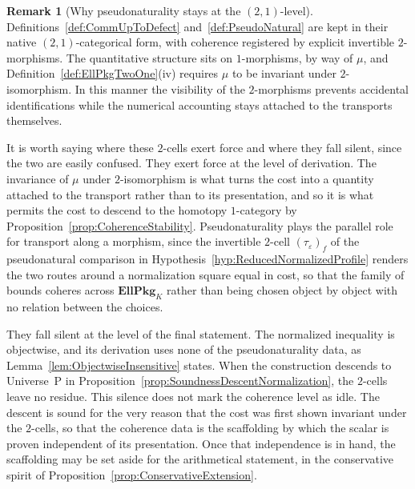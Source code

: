 \documentclass[10pt, reqno]{amsart}
\theoremstyle{plain}
\theoremstyle{definition}
\newtheorem{remark}[theorem]{Remark}
\theoremstyle{plain}
\begin{document}
\begin{remark}[Why pseudonaturality stays at the $(2,1)$-level]\label{rem:PseudoNaturalNotBicategorical}
Definitions~\ref{def:CommUpToDefect} and~\ref{def:PseudoNatural} are kept in their native $(2,1)$-categorical form, with coherence registered by explicit invertible $2$-morphisms. The quantitative structure sits on $1$-morphisms, by way of $\mu$, and Definition~\ref{def:EllPkgTwoOne}\textup{(iv)} requires $\mu$ to be invariant under $2$-isomorphism. In this manner the visibility of the $2$-morphisms prevents accidental identifications while the numerical accounting stays attached to the transports themselves.

It is worth saying where these $2$-cells exert force and where they fall silent, since the two are easily confused. They exert force at the level of derivation. The invariance of $\mu$ under $2$-isomorphism is what turns the cost into a quantity attached to the transport rather than to its presentation, and so it is what permits the cost to descend to the homotopy $1$-category by Proposition~\ref{prop:CoherenceStability}. Pseudonaturality plays the parallel role for transport along a morphism, since the invertible $2$-cell $(\tau_\varepsilon)_f$ of the pseudonatural comparison in Hypothesis~\ref{hyp:ReducedNormalizedProfile} renders the two routes around a normalization square equal in cost, so that the family of bounds coheres across $\mathbf{EllPkg}_K$ rather than being chosen object by object with no relation between the choices.

They fall silent at the level of the final statement. The normalized inequality is objectwise, and its derivation uses none of the pseudonaturality data, as Lemma~\ref{lem:ObjectwiseInsensitive} states. When the construction descends to Universe~P in Proposition~\ref{prop:SoundnessDescentNormalization}, the $2$-cells leave no residue. This silence does not mark the coherence level as idle. The descent is sound for the very reason that the cost was first shown invariant under the $2$-cells, so that the coherence data is the scaffolding by which the scalar is proven independent of its presentation. Once that independence is in hand, the scaffolding may be set aside for the arithmetical statement, in the conservative spirit of Proposition~\ref{prop:ConservativeExtension}.
\end{remark}
\end{document}
